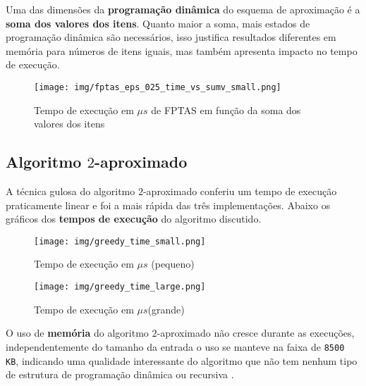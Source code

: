 \documentclass[12pt]{article}
\begin{document}
Uma das dimensões da \textbf{programação dinâmica} do esquema de aproximação é a \textbf{soma dos valores dos itens}. Quanto maior a soma, mais estados de programação dinâmica são necessários, isso justifica resultados diferentes em memória para números de itens iguais, mas também apresenta impacto no tempo de execução.

\begin{figure}[H]
    \centering
    \texttt{[image: img/fptas\_eps\_025\_time\_vs\_sumv\_small.png]}
    \caption{Tempo de execução em \(\mu s\) de FPTAS em função da soma dos valores dos itens}
    \label{fig:enter-label}
\end{figure}

\vspace{-1cm}

\subsection{Algoritmo \(2\)-aproximado}

A técnica gulosa do algoritmo \(2\)-aproximado conferiu um tempo de execução praticamente linear e foi a mais rápida das três implementações. Abaixo os gráficos dos \textbf{tempos de execução} do algoritmo discutido.

\vspace{-0.3cm}

\begin{figure}[H]
    \centering
    \begin{minipage}[b]{0.48\linewidth}
        \centering
        \texttt{[image: img/greedy\_time\_small.png]}
        \caption{Tempo de execução em \(\mu s\) (pequeno)}
        \label{fig:fptas_small}
    \end{minipage}
    \hfill
    \begin{minipage}[b]{0.48\linewidth}
        \centering
        \texttt{[image: img/greedy\_time\_large.png]}
        \caption{Tempo de execução em \(\mu s\)(grande)}
        \label{fig:fptas_large}
    \end{minipage}
\end{figure}
\vspace{-0.5cm}

O uso de \textbf{memória} do algoritmo \(2\)-aproximado não cresce durante as execuções, independentemente do tamanho da entrada o uso se manteve na faixa de \texttt{8500 KB}, indicando uma qualidade interessante do algoritmo que não tem nenhum tipo de estrutura de programação dinâmica ou recursiva .
\end{document}
